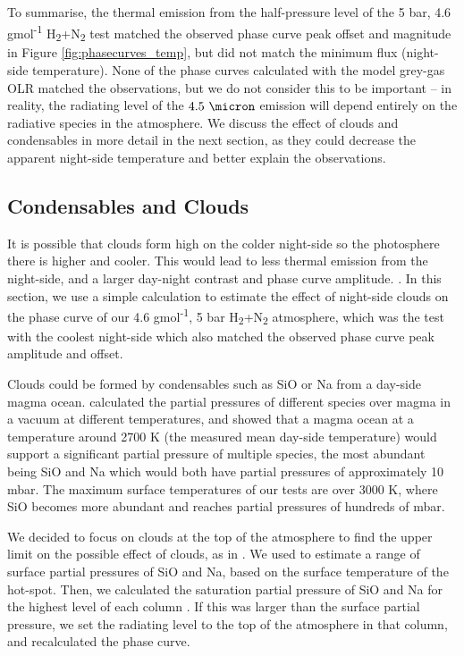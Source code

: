To summarise, the thermal emission from the half-pressure level of the 5 bar, 4.6 gmol\textsuperscript{-1} H\textsubscript{2}+N\textsubscript{2} test matched the observed phase curve peak offset and magnitude in Figure \ref{fig:phasecurves_temp}, but did not match the minimum flux (night-side temperature). None of the phase curves calculated with the model grey-gas OLR matched the observations, but we do not consider this to be important -- in reality, the radiating level of the $4.5\ \micron$ emission will depend entirely on the radiative species in the atmosphere. We discuss the effect of clouds and condensables in more detail in the next section, as they could decrease the apparent night-side temperature and better explain the observations.





\subsection{Condensables and Clouds}\label{sec:condensables}

It is possible that clouds form high on the colder night-side so the photosphere there is higher and cooler. This would lead to less thermal emission from the night-side, and a larger day-night contrast and phase curve amplitude. \citep{parmentier2016transitions}. In this section, we use a simple calculation to estimate the effect of night-side clouds on the phase curve of our 4.6 gmol\textsuperscript{-1}, 5 bar H\textsubscript{2}+N\textsubscript{2} atmosphere, which was the test with  the coolest night-side which also matched the observed phase curve peak amplitude and offset.

Clouds could be formed by condensables such as SiO or Na from a day-side magma ocean. \citet{miguel2011compositions} calculated the partial pressures of different species over magma in a vacuum at different temperatures, and showed that a magma ocean at a temperature around 2700 K (the measured mean day-side temperature) would support a significant partial pressure of multiple species, the most abundant being SiO and Na which would both have partial pressures of approximately 10 mbar. The maximum surface temperatures of our tests are over 3000 K, where SiO becomes more abundant and reaches partial pressures of hundreds of mbar.

We decided to focus on clouds at the top of the atmosphere to find the upper limit on the possible effect of clouds, as in \citet{parmentier2016transitions}. We used \citet{miguel2011compositions} to estimate a range of surface partial pressures of SiO and Na, based on the surface temperature of the hot-spot. Then, we calculated the saturation partial pressure of SiO and Na for the highest level of each column \citep{wetzel2013sio}. If this was larger than the surface partial pressure, we set the radiating level to the top of the atmosphere in that column, and recalculated the phase curve.


